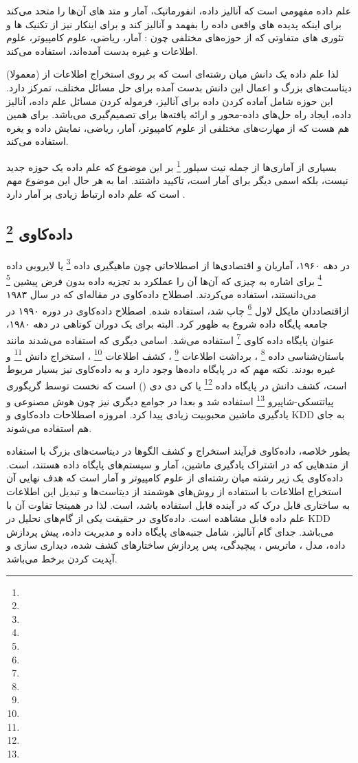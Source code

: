 \documentclass[a4paper, 12pt]{article}
\begin{document}
 علم داده مفهومی است که آنالیز داده، انفورماتیک، آمار و متد های آن‌ها را متحد می‌کند برای اینکه پدیده های واقعی داده را بفهمد و آنالیز کند و برای اینکار نیز از تکنیک ها و تئوری های متفاوتی که از حوزه‌های مختلفی چون : آمار، ریاضی، علوم کامپیوتر، علوم اطلاعات و غیره بدست آمده‌اند، استفاده می‌کند. 
 
 لذا علم داده یک دانش میان رشته‌ای است که بر روی استخراج اطلاعات از (معمولا) دیتاست‌های بزرگ و اعمال این دانش بدست آمده برای حل مسائل مختلف، تمرکز دارد. این حوزه شامل آماده کردن داده برای آنالیز، فرموله کردن مسائل علم داده، آنالیز داده، ایجاد راه حل‌های داده-محور و ارائه یافته‌ها برای تصمیم‌گیری می‌باشد. برای همین هم هست که از مهارت‌های مختلفی از علوم کامپیوتر، آمار، ریاضی، نمایش داده و یغره استفاده می‌کند. 
 
 بسیاری از آماری‌ها از جمله نیت سیلور
 \footnote{}
 بر این موضوع که علم داده یک حوزه جدید نیست، بلکه اسمی دیگر برای آمار است، تاکیید داشتند. اما به هر حال این موضوع مهم است که علم داده ارتباط زیادی بر آمار دارد .
 
 
 \subsection*{داده‌کاوی
\footnote{} 
} 
در دهه ۱۹۶۰، آماریان و اقتصادی‌ها از اصطلاحاتی چون ماهیگیری داده 
\footnote{}
یا لایروبی داده
\footnote{}
برای اشاره به چیزی که آن‌ها آن‌ را عملکرد بد تجزیه داده بدون فرض پیشین
\footnote{}
می‌دانستند، 
استفاده می‌کردند. 
اصطلاح داده‌کاوی در مقاله‌ای که در سال ۱۹۸۳ ازاقتصاددان مایکل لاول 
\footnote{}
 چاپ شد، استفاده شده. 
 اصطلاح داده‌کاوی در دوره ۱۹۹۰ در جامعه پایگاه داده شروع به ظهور کرد. البته برای یک دوران کوتاهی در دهه ۱۹۸۰، عنوان پایگاه داده کاوی 
 \footnote{}
 استفاده می‌شد. اسامی دیگری که استفاده می‌شدند مانند باستان‌شناسی داده
 \footnote{}
 ، 
 برداشت اطلاعات
 \footnote{}
 ،
 کشف اطلاعات
 \footnote{}
،
استخراج دانش 
\footnote{}
و غیره بودند. 
نکته مهم که در پایگاه داده‌ها وجود دارد و به داده‌کاوی نیز بسیار مربوط است، کشف دانش در پایگاه داده 
\footnote{}
یا کی دی دی 
()
است که نخست توسط گریگوری پیاتتسکی-شاپیرو 
\footnote{}
 استفاده شد و بعدا در جوامع دیگری نیز چون هوش مصنوعی و یادگیری ماشین محبوبیت زیادی پیدا کرد. 
امروزه اصطلاحات داده‌کاوی و KDD به جای هم استفاده می‌شوند.

بطور خلاصه، داده‌کاوی فرآیند استخراج و کشف الگوها در دیتاست‌های بزرگ با استفاده از متد‌هایی که در اشتراک یادگیری ماشین، آمار و سیستم‌های پایگاه‌ داده هستند، است. 
داده‌کاوی یک زیر رشته میان رشته‌ای از علوم کامپیوتر و آمار است که هدف نهایی آن استخراج اطلاعات با استفاده از روش‌های هوشمند از دیتاست‌ها و تبدیل این اطلاعات به ساختاری قابل درک که در آینده قابل استفاده باشد، است. لذا در همینجا تفاوت آن با علم داده قابل مشاهده است. داده‌کاوی در حقیقت یکی از گام‌های نحلیل در KDD می‌باشد. جدای گام آنالیز، شامل جنبه‌های پایگاه داده و مدیریت داده، پیش پردازش داده، مدل ،  ماتریس ، پیچیدگی، پس پردازش ساختارهای کشف شده، دیداری سازی و آپدیت کردن برخط می‌باشد.
\end{document}
